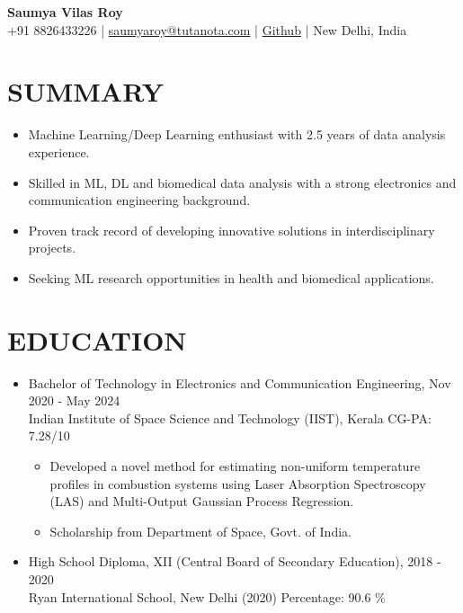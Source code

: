 \documentclass[11pt]{article}
\begin{document}
	
	\begin{center}
		{\huge\bf Saumya Vilas Roy} \\
		
		\vspace{3mm} %
		{\large
			+91 8826433226 |
			\href{mailto:saumyaroy@tutanota.com}{saumyaroy@tutanota.com} |
				\href{https://4d2.link/saumya}{Github} |
			New Delhi, India
		} \\
		{
	
		}
	\end{center}
	
	\section*{\bf SUMMARY}
	\begin{itemize}[leftmargin=*,noitemsep,topsep=0pt]
		\item Machine Learning/Deep Learning enthusiast with 2.5 years of data analysis experience.
		\item Skilled in ML, DL and biomedical data analysis with a strong electronics and communication  engineering background.
		\item Proven track record of developing innovative solutions in interdisciplinary projects.
		\item Seeking ML research opportunities in health and biomedical applications.
	\end{itemize}
	
	\section*{\bf EDUCATION}
	\begin{itemize}[leftmargin=*,noitemsep,topsep=0pt]
		\item Bachelor of Technology in Electronics and Communication Engineering, \hfill Nov 2020 - May 2024 \\
		Indian Institute of Space Science and Technology (IIST), Kerala \hfill CG-PA: 7.28/10
		\begin{itemize}[leftmargin=*,noitemsep,topsep=0pt]
			\item Developed a novel method for estimating non-uniform temperature profiles in combustion systems using Laser Absorption Spectroscopy (LAS) and Multi-Output Gaussian Process Regression.
			\item Scholarship from Department of Space, Govt. of India.
		\end{itemize}
		\item High School Diploma, XII (Central Board of Secondary Education), \hfill 2018 - 2020\\
		Ryan International School, New Delhi (2020)  \hfill Percentage: 90.6 \%
	\end{itemize}
	
\end{document}
